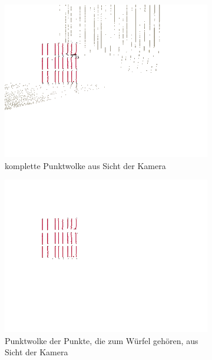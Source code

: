 \documentclass[ngerman,a4paper,parskip=half]{scrartcl}
\begin{document}
\begin{figure}[H]
	\centering
	\begin{subfigure}{0.45\textwidth}
		\includegraphics[width=\textwidth,frame]{includes/diff_red_cam.png}
		\caption{komplette Punktwolke aus Sicht der Kamera}
	\end{subfigure}
	\hfill
	\begin{subfigure}{0.45\textwidth}
		\includegraphics[width=\textwidth,frame]{includes/diff_only_red_cam.png}
		\caption{Punktwolke der Punkte, die zum Würfel gehören, aus Sicht der Kamera}
	\end{subfigure}
	\begin{subfigure}{0.45\textwidth}

\end{subfigure}
\end{figure}
\end{document}
